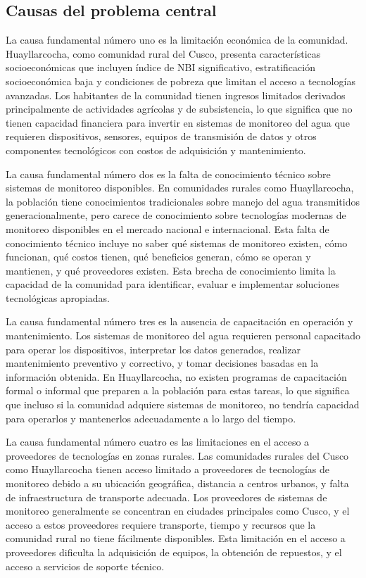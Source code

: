 \subsection{Causas del problema central}
La causa fundamental número uno es la limitación económica de la comunidad. Huayllarcocha, como comunidad rural del Cusco, presenta características socioeconómicas que incluyen índice de NBI significativo, estratificación socioeconómica baja y condiciones de pobreza que limitan el acceso a tecnologías avanzadas. Los habitantes de la comunidad tienen ingresos limitados derivados principalmente de actividades agrícolas y de subsistencia, lo que significa que no tienen capacidad financiera para invertir en sistemas de monitoreo del agua que requieren dispositivos, sensores, equipos de transmisión de datos y otros componentes tecnológicos con costos de adquisición y mantenimiento.

La causa fundamental número dos es la falta de conocimiento técnico sobre sistemas de monitoreo disponibles. En comunidades rurales como Huayllarcocha, la población tiene conocimientos tradicionales sobre manejo del agua transmitidos generacionalmente, pero carece de conocimiento sobre tecnologías modernas de monitoreo disponibles en el mercado nacional e internacional. Esta falta de conocimiento técnico incluye no saber qué sistemas de monitoreo existen, cómo funcionan, qué costos tienen, qué beneficios generan, cómo se operan y mantienen, y qué proveedores existen. Esta brecha de conocimiento limita la capacidad de la comunidad para identificar, evaluar e implementar soluciones tecnológicas apropiadas.

La causa fundamental número tres es la ausencia de capacitación en operación y mantenimiento. Los sistemas de monitoreo del agua requieren personal capacitado para operar los dispositivos, interpretar los datos generados, realizar mantenimiento preventivo y correctivo, y tomar decisiones basadas en la información obtenida. En Huayllarcocha, no existen programas de capacitación formal o informal que preparen a la población para estas tareas, lo que significa que incluso si la comunidad adquiere sistemas de monitoreo, no tendría capacidad para operarlos y mantenerlos adecuadamente a lo largo del tiempo.

La causa fundamental número cuatro es las limitaciones en el acceso a proveedores de tecnologías en zonas rurales. Las comunidades rurales del Cusco como Huayllarcocha tienen acceso limitado a proveedores de tecnologías de monitoreo debido a su ubicación geográfica, distancia a centros urbanos, y falta de infraestructura de transporte adecuada. Los proveedores de sistemas de monitoreo generalmente se concentran en ciudades principales como Cusco, y el acceso a estos proveedores requiere transporte, tiempo y recursos que la comunidad rural no tiene fácilmente disponibles. Esta limitación en el acceso a proveedores dificulta la adquisición de equipos, la obtención de repuestos, y el acceso a servicios de soporte técnico.

